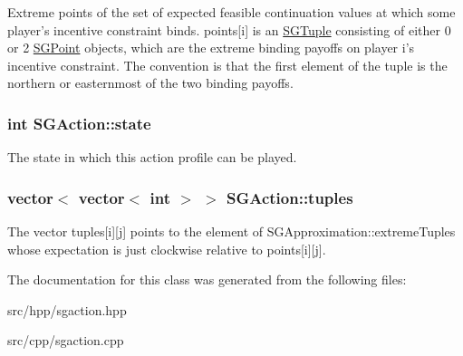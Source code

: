 Extreme points of the set of expected feasible continuation values at which some player's incentive constraint binds. points\mbox{[}i\mbox{]} is an \hyperlink{classSGTuple}{S\-G\-Tuple} consisting of either 0 or 2 \hyperlink{classSGPoint}{S\-G\-Point} objects, which are the extreme binding payoffs on player i's incentive constraint. The convention is that the first element of the tuple is the northern or easternmost of the two binding payoffs. \hypertarget{classSGAction_a1ad4ae3feb4e3ec46e21273dd51a6004}{
\subsubsection[{state}]{\setlength{\rightskip}{0pt plus 5cm}int S\-G\-Action\-::state\hspace{0.3cm}{\ttfamily [protected]}}}\label{classSGAction_a1ad4ae3feb4e3ec46e21273dd51a6004}
The state in which this action profile can be played. \hypertarget{classSGAction_a60599bc5a745db1557191a61c0db28b3}{
\subsubsection[{tuples}]{\setlength{\rightskip}{0pt plus 5cm}vector$<$ vector$<$ int $>$ $>$ S\-G\-Action\-::tuples\hspace{0.3cm}{\ttfamily [protected]}}}\label{classSGAction_a60599bc5a745db1557191a61c0db28b3}
The vector tuples\mbox{[}i\mbox{]}\mbox{[}j\mbox{]} points to the element of S\-G\-Approximation\-::extreme\-Tuples whose expectation is just clockwise relative to points\mbox{[}i\mbox{]}\mbox{[}j\mbox{]}. 

The documentation for this class was generated from the following files\-:\begin{DoxyCompactItemize}
\item 
src/hpp/sgaction.\-hpp\item 
src/cpp/sgaction.\-cpp\end{DoxyCompactItemize}
